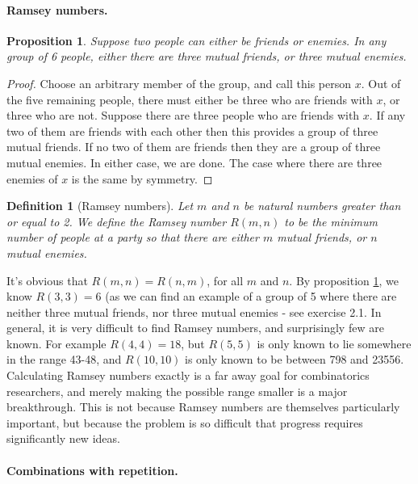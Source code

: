 \documentclass{article}
\theoremstyle{plain}
\newtheorem{proposition}[theorem]{Proposition}{\bfseries}{\itshape}
\newtheorem{definition}[theorem]{Definition}{\bfseries}{\upshape}
\begin{document}
\paragraph{Ramsey numbers.}

\begin{proposition}\label{P:Ramsey}
Suppose two people can either be friends or enemies. In any group of 6 people, either there are three mutual friends, or three mutual enemies.
\end{proposition}
\begin{proof}
Choose an arbitrary member of the group, and call this person $x$. Out of the five remaining people, there must either be three who are friends with $x$, or three who are not. Suppose there are three people who are friends with $x$. If any two of them are friends with each other then this provides a group of three mutual friends. If no two of them are friends then they are a group of three mutual enemies. In either case, we are done. The case where there are three enemies of $x$ is the same by symmetry. 
\end{proof}

\begin{definition}[Ramsey numbers]
Let $m$ and $n$ be natural numbers greater than or equal to 2. We define the \emph{Ramsey number} $R(m,n)$ to be the minimum number of people at a party so that there are either $m$ mutual friends, or $n$ mutual enemies.  
\end{definition}

It's obvious that $R(m,n)=R(n,m)$, for all $m$ and $n$. By proposition \ref{P:Ramsey}, we know $R(3,3)=6$ (as we can find an example of a group of 5 where there are neither three mutual friends, nor three mutual enemies - see exercise 2.1. In general, it is very difficult to find Ramsey numbers, and surprisingly few are known. For example $R(4,4) = 18$, but $R(5,5)$ is only known to lie somewhere in the range 43-48, and $R(10,10)$ is only known to be between 798 and 23556. Calculating Ramsey numbers exactly is a far away goal for combinatorics researchers, and merely making the possible range smaller is a major breakthrough. This is not because Ramsey numbers are themselves particularly important, but because the problem is so difficult that progress requires significantly new ideas.
 
\paragraph{Combinations with repetition.}
\end{document}
